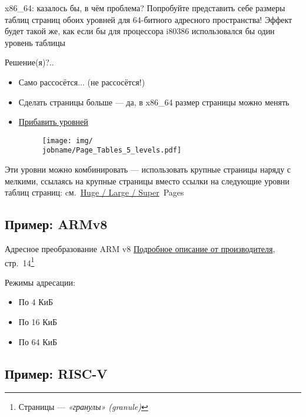 \documentclass[xetex,aspectratio=43]{beamer}
\begin{document}
\begin{frame}{x86\_64: казалось бы, в чём проблема?}
    Попробуйте представить себе размеры таблиц страниц обоих уровней для 64-битного адресного пространства! Эффект будет такой же, как если бы для процессора i80386 использовался бы один уровень таблицы

    Решение(я)?..

    \begin{itemize}
        \pause
        \item Само рассосётся... (не рассосётся!) %
        \pause
        \item Сделать страницы больше --- да, в x86\_64 размер страницы можно менять
        \pause
        \item \href{https://en.wikipedia.org/wiki/Intel_5-level_paging}{Прибавить уровней}
        \begin{figure}
            \texttt{[image: img/\\jobname/Page\_Tables\_5\_levels.pdf]}
        \end{figure}
    \end{itemize}

    \pause

    Эти уровни можно комбинировать --- использовать крупные страницы наряду с мелкими,
    ссылаясь на крупные страницы вместо ссылки на следующие уровни таблиц страниц:
    cм.~\href{https://wiki.debian.org/Hugepages}{Huge / Large / Super}~Pages

\end{frame}

\subsection{Пример: ARMv8}

\begin{frame}{Адресное преобразование ARM v8}
    \href{https://documentation-service.arm.com/static/5efa1d23dbdee951c1ccdec5}{Подробное описание от производителя}, стр.~14\footnote{Страницы --- \emph{«гранулы» (granule)}}

    Режимы адресации:
    \begin{itemize}
        \item По 4 КиБ
        \item По 16 КиБ
        \item По 64 КиБ
    \end{itemize}
\end{frame}

\subsection{Пример: RISC-V}
\end{document}
